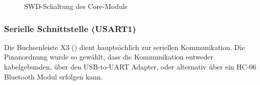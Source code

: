 \begin{figure}[H]
    \centering
    \qquad
    \qquad
    \caption[SWD-Schaltung des Core-Moduls]{SWD-Schaltung des \gls{Core-Modul}s}
    \label{fig:coremodul-swd2}
\end{figure}

\subsubsection{Serielle Schnittstelle (USART1)}
Die Buchsenleiste X3 () dient hauptsächlich zur seriellen Kommunikation. Die Pinanordnung wurde so gewählt, dass die Kommunikation entweder kabelgebunden, über den \gls{USB-to-UART} Adapter, oder alternativ über ein HC-06 Bluetooth Modul erfolgen kann.

